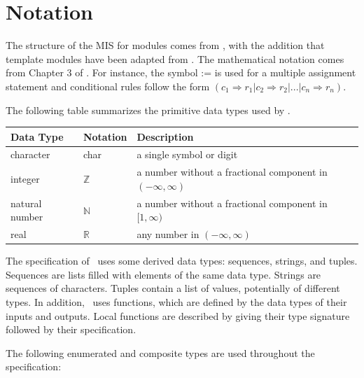 \section{Notation}

The structure of the MIS for modules comes from \citet{HoffmanAndStrooper1995},
with the addition that template modules have been adapted from
\cite{GhezziEtAl2003}. The mathematical notation comes from Chapter 3 of
\citet{HoffmanAndStrooper1995}. For instance, the symbol := is used for a
multiple assignment statement and conditional rules follow the form $(c_1
\Rightarrow r_1 | c_2 \Rightarrow r_2 | ... | c_n \Rightarrow r_n )$.

The following table summarizes the primitive data types used by \progname.

\begin{center}
\renewcommand{\arraystretch}{1.2}
\noindent
\begin{tabularx}{\textwidth}{l l X}
\toprule
\textbf{Data Type} & \textbf{Notation} & \textbf{Description}\\
\midrule
character & char & a single symbol or digit\\
integer & $\mathbb{Z}$ & a number without a fractional component in $(-\infty, \infty)$ \\
natural number & $\mathbb{N}$ & a number without a fractional component in $[1, \infty)$ \\
real & $\mathbb{R}$ & any number in $(-\infty, \infty)$\\
\bottomrule
\end{tabularx}
\end{center}

\noindent
The specification of \progname \ uses some derived data types: sequences, strings, and
tuples. Sequences are lists filled with elements of the same data type. Strings
are sequences of characters. Tuples contain a list of values, potentially of
different types. In addition, \progname \ uses functions, which
are defined by the data types of their inputs and outputs. Local functions are
described by giving their type signature followed by their specification.

\noindent
The following enumerated and composite types are used throughout the specification:

